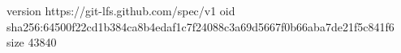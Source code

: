 version https://git-lfs.github.com/spec/v1
oid sha256:64500f22cd1b384ca8b4edaf1c7f24088c3a69d5667f0b66aba7de21f5c841f6
size 43840
